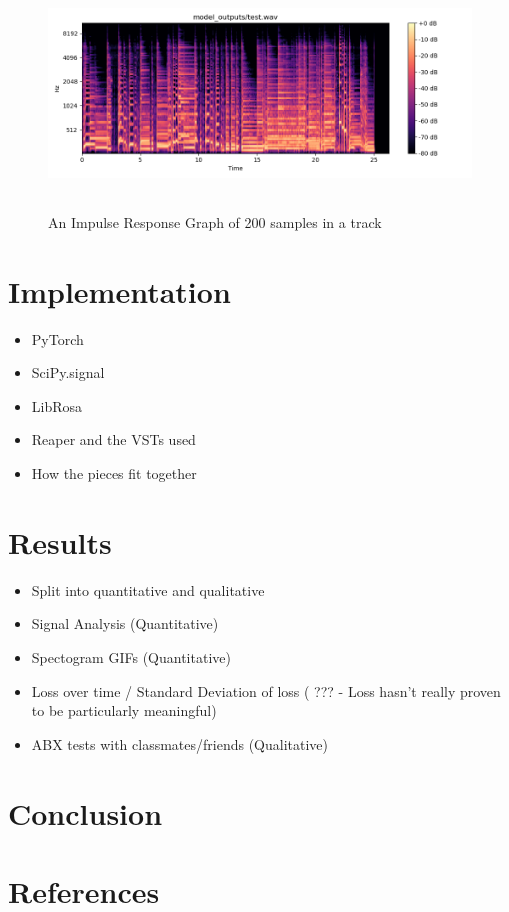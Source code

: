 \documentclass{l4proj}
\providecommand{\tightlist}{%
  \setlength{\itemsep}{0pt}\setlength{\parskip}{0pt}}
\begin{document}
\begin{figure}
\centering
\includegraphics[width=6in,height=2.4in]{images/spect.png}
\caption{An Impulse Response Graph of 200 samples in a
track\label{fig:impulse}}
\end{figure}

\hypertarget{implementation}{%
\chapter{Implementation}\label{implementation}}

\begin{itemize}
\tightlist
\item
  PyTorch
\item
  SciPy.signal
\item
  LibRosa
\item
  Reaper and the VSTs used
\item
  How the pieces fit together
\end{itemize}

\hypertarget{results}{%
\chapter{Results}\label{results}}

\begin{itemize}
\tightlist
\item
  Split into quantitative and qualitative
\item
  Signal Analysis (Quantitative)
\item
  Spectogram GIFs (Quantitative)
\item
  Loss over time / Standard Deviation of loss ( ??? - Loss hasn't really
  proven to be particularly meaningful)
\item
  ABX tests with classmates/friends (Qualitative)
\end{itemize}

\hypertarget{conclusion}{%
\chapter{Conclusion}\label{conclusion}}

\hypertarget{references}{%
\chapter{References}\label{references}}
\end{document}

